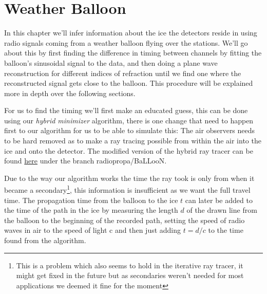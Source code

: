 \chapter{Weather Balloon}
\label{chap:WB}
In this chapter we'll infer information about the ice the detectors reside in
using radio signals coming from a weather balloon flying over the stations. 
We'll go about this by first finding the difference in timing between  
channels by fitting the balloon's sinusoidal signal to the data, and
then doing a plane wave reconstruction for different indices of refraction
until we find one where the reconstructed signal gets close to the balloon.
This procedure will be explained more in depth over the following sections.

For us to find the timing we'll first make an educated guess, this can be done
using our \textit{hybrid minimizer} algorithm, there is one change that need to
happen first to our algorithm for us to be able to simulate this: The air
observers needs to be hard removed as to make a ray tracing possible from
within the air into the ice and onto the detector. The modified
version of the hybrid ray tracer can be found \href{https://github.com/arthuradriaens-code/NuRadioMC.git}{here} under the branch radiopropa/BaLLooN.

Due to the way our algorithm works the time the ray took is only from when it
became a secondary\footnote{This is a problem which also seems to hold in the 
iterative ray tracer, it might get fixed in the future but as
secondaries weren't needed for most applications we deemed it fine for the
moment}, this information is insufficient as we want the full travel time.  The
propagation time from the balloon to the ice $t$ can later be added to the time
of the path in the ice by measuring the length $d$ of the drawn line from the
balloon to the beginning of the recorded path, setting the speed of radio waves
in air to the speed of light c and then just adding $t = d/c$ to the time found
from the algorithm.

